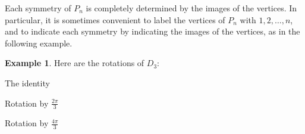 \documentclass[12pt]{report}
\numberwithin{equation}{section}
\numberwithin{theorem}{chapter}
\theoremstyle{definition}
\newtheorem{example}[theorem]{Example}
\newtheorem*{basic properties}{Basic Properties}
\newtheorem*{Important Remark}{Important Remark}
\begin{document}
Each symmetry of $P_n$ is completely determined by the images of the vertices. In particular, it is sometimes convenient to label the vertices of $P_n$ with $1, 2, \ldots, n$, and to indicate each symmetry by indicating the images of the vertices, as in the following example.

\begin{example}
Here are the rotations of $D_3$:


\vspace{0.5em}
\begin{minipage}{0.32\textwidth}
	\begin{center}

\vspace{0.7em}

The identity
\end{center}
\end{minipage}
\begin{minipage}{0.32\textwidth}
	\begin{center}

\vspace{0.7em}

Rotation by $\frac{2 \pi }{3}$
\end{center}
\end{minipage}
\begin{minipage}{0.32\textwidth}
	\begin{center}

\vspace{0.7em}

Rotation by $\frac{4 \pi }{3}$
\end{center}
\end{minipage}


\vspace{0.5em}
\end{example}
\end{document}

